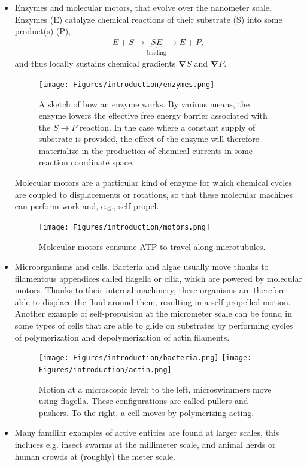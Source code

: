 \begin{itemize}
    \item Enzymes and molecular motors, that evolve over the nanometer scale. Enzymes (E) catalyze chemical reactions of their substrate (S) into some product(s) (P),
    \begin{align}
        E + S \longrightarrow  \underbrace{SE}_{\mathrm{binding}} \longrightarrow  E + P,
    \end{align}
     and thus locally sustains chemical gradients $\bm \nabla S$ and $\bm \nabla P$. 
     \begin{figure}[H]
        \centering
        \texttt{[image: Figures/introduction/enzymes.png]}
        \caption{A sketch of how an enzyme works. By various means, the enzyme lowers the effective free energy barrier associated with the $S \to P$ reaction. In the case where a constant supply of substrate is provided, the effect of the enzyme will therefore materialize in the production of chemical currents in some reaction coordinate space.}
        \label{fig: enzymes}
    \end{figure}
    
     Molecular motors are a particular kind of enzyme for which chemical cycles are coupled to displacements or rotations, so that these molecular machines can perform work and, e.g., self-propel.
     \begin{figure}[!htb]
        \centering
        \texttt{[image: Figures/introduction/motors.png]}
        \caption{Molecular motors consume ATP to travel along microtubules.}
        \label{fig: motors}
     \end{figure}
    \item Microorganisms and cells. Bacteria and algae usually move thanks to filamentous appendices called flagella or cilia, which are powered by molecular motors.
    Thanks to their internal machinery, these organisms are therefore able to displace the fluid around them, resulting in a self-propelled motion.
    Another example of self-propulsion at the micrometer scale can be found in some types of cells that are able to glide on substrates by performing cycles of polymerization and depolymerization of actin filaments.
    \\
    \begin{figure}[!htb]
        \centering
        \texttt{[image: Figures/introduction/bacteria.png]} 
        \hspace{2cm}
        \texttt{[image: Figures/introduction/actin.png]}
        \caption{Motion at a microscopic level: to the left, microswimmers move using flagella. These configurations are called pullers and pushers. To the right, a cell moves by polymerizing acting.}
        \label{fig: label}
    \end{figure}
     
    \item Many familiar examples of active entities are found at larger scales, this incluces e.g. insect swarms at the millimeter scale, and animal herds or human crowds at (roughly) the meter scale.
\end{itemize}


